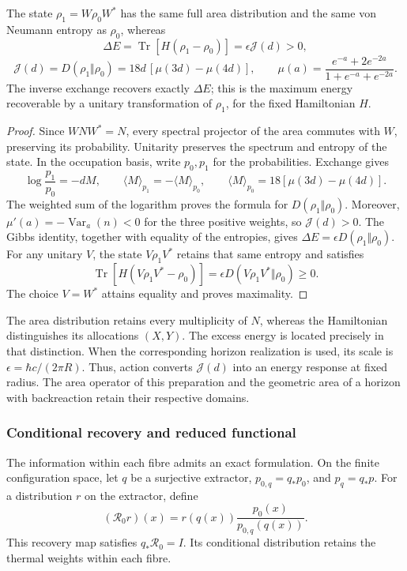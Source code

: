 \begin{proposition}
\label{ins29:v:respuesta}
The state \(\rho_1=W\rho_0W^*\) has the same full area distribution
and the same von Neumann entropy as \(\rho_0\), whereas
\[
 \Delta E=\operatorname{Tr}[H(\rho_1-\rho_0)]
 =\epsilon\mathcal J(d)>0,
\]
\[
 \mathcal J(d)=D(\rho_1\Vert\rho_0)
 =18d\,[\mu(3d)-\mu(4d)],\qquad
 \mu(a)=\frac{e^{-a}+2e^{-2a}}{1+e^{-a}+e^{-2a}}.
\]
The inverse exchange recovers exactly \(\Delta E\); this is the maximum
energy recoverable by a unitary transformation of \(\rho_1\), for the
fixed Hamiltonian \(H\).
\end{proposition}
\begin{proof}
Since \(WNW^*=N\), every spectral projector of the area commutes with
\(W\), preserving its probability. Unitarity preserves the spectrum
and entropy of the state. In the occupation basis, write \(p_0,p_1\)
for the probabilities. Exchange gives
\[
 \log\frac{p_1}{p_0}=-dM,\qquad
 \langle M\rangle_{p_1}=-\langle M\rangle_{p_0},\qquad
 \langle M\rangle_{p_0}=18[\mu(3d)-\mu(4d)].
\]
The weighted sum of the logarithm proves the formula for
\(D(\rho_1\Vert\rho_0)\). Moreover,
\(\mu'(a)=-\operatorname{Var}_a(n)<0\) for the three positive weights,
so \(\mathcal J(d)>0\).
The Gibbs identity, together with equality of the entropies, gives
\(\Delta E=\epsilon D(\rho_1\Vert\rho_0)\).
For any unitary \(V\), the state \(V\rho_1V^*\) retains that same
entropy and satisfies
\[
 \operatorname{Tr}[H(V\rho_1V^*-\rho_0)]
 =\epsilon D(V\rho_1V^*\Vert\rho_0)\geq0.
\]
The choice \(V=W^*\) attains equality and proves maximality.
\end{proof}

The area distribution retains every multiplicity of \(N\), whereas
the Hamiltonian distinguishes its allocations \((X,Y)\). The excess
energy is located precisely in that distinction. When the corresponding
horizon realization is used, its scale is
\(\epsilon=\hbar c/(2\pi R)\). Thus, action converts \(\mathcal J(d)\)
into an energy response at fixed radius. The area operator of this
preparation and the geometric area of a horizon with backreaction retain
their respective domains.

\subsubsection{Conditional recovery and reduced functional}

The information within each fibre admits an exact formulation. On the
finite configuration space, let \(q\) be a surjective extractor,
\(p_{0,q}=q_*p_0\), and \(p_q=q_*p\). For a distribution \(r\) on the
extractor, define
\[
 (\mathcal R_0r)(x)
 =r(q(x))\frac{p_0(x)}{p_{0,q}(q(x))}.
\]
This recovery map satisfies \(q_*\mathcal R_0=I\). Its conditional
distribution retains the thermal weights within each fibre.

